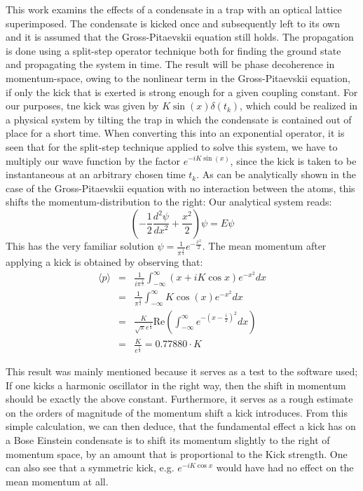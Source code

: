 This work examins the effects of a condensate in a trap with an optical lattice superimposed. The condensate is kicked 
once and subsequently left to its own and it is assumed that the Gross-Pitaevskii equation still holds. The propagation is done using a split-step operator technique both for finding the ground state and
propagating the system in time. The result will be phase decoherence in momentum-space, owing to the nonlinear term
in the Gross-Pitaevskii equation, if only the kick that is exerted is strong enough for a given coupling constant.
For our purposes, tne kick was given by $K\sin(x)\delta(t_k)$, which could be realized in a 
physical system by tilting the trap in which the
condensate is contained out of place for a short time. When converting this into an exponential operator, it is seen that 
for the split-step technique applied to solve this system, we have to multiply
our wave function by the factor $e^{-iK\sin(x)}$, since the kick is taken to be instantaneous at an arbitrary chosen time $t_k$. 
As can be analytically shown in the case of the Gross-Pitaevskii equation 
with no interaction between the atoms, this shifts the momentum-distribution to the right:
Our analytical system reads:
\begin{equation}\label{eq:HO}	
	\left(-\frac{1}{2}\frac{d^2 \psi}{dx^2}+\frac{x^2}{2}\right)\psi = E\psi
\end{equation}
This has the very familiar solution $\psi=\frac{1}{\pi^{\frac{1}{4} } }e^{-\frac{x^2}{2} }$. The mean momentum after applying a kick is obtained by observing that:
\begin{eqnarray}
\langle p \rangle & = & \frac{1}{i\pi^{\frac{1}{2} } }\int_{-\infty}^{\infty}(x+iK\cos x)e^{-x^2}dx\nonumber\\
	{}&=&  \frac{1}{\pi^{\frac{1}{2} } }\int_{-\infty}^{\infty}K\cos(x)e^{-x^2}dx\nonumber\\
	{}&=&  \frac{K}{\sqrt{\pi}e^{\frac{1}{4} } }\textrm{Re}\left(\int_{-\infty}^{\infty}e^{-(x-\frac{i}{2})^2}dx\right)\nonumber\\
	{}&=&  \frac{K}{e^{\frac{1}{4}}} = 0.77880\cdot K\label{eq:firstmom}
\end{eqnarray}

This result was mainly mentioned because it serves as a test to the software used; If one kicks a harmonic oscillator in the 
right way, then the shift in momentum should be exactly the above constant. Furthermore, it serves as a rough estimate on the orders of 
magnitude of the momentum shift a kick introduces. From this simple calculation, we can then deduce, that the fundamental effect a kick has 
on a Bose Einstein condensate is to shift its momentum slightly to the right of momentum space, by an amount that is proportional to the 
Kick strength. One can also see that a symmetric kick, e.g. $e^{-iK\cos x}$ would have had no effect on the mean momentum at all.


